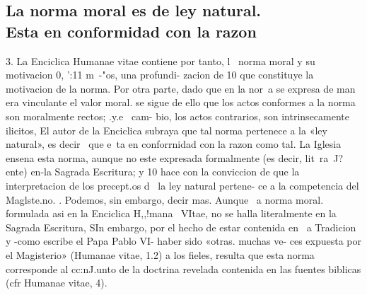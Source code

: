 \documentclass[letterpaper]{report}
\begin{document}
		\subsection{La norma moral es de ley natural.\\ Esta en conformidad con la razon}
			3. La Enciclica Humanae vitae contiene por tanto, l~ 
			norma moral y su motivacion 0, ':11 m~-"os, una profundi- 
			zacion de 10 que constituye la motivacion de la norma. Por 
			otra parte, dado que en la nor~a se expresa de man era 
			vinculante el valor moral. se sigue de ello que los actos 
			conformes a la norma son moralmente rectos; .y.e~ cam- 
			bio, los actos contrarios, son intrinsecamente ilicitos, El 
			autor de la Enciclica subraya que tal norma pertenece a 
			la «ley natural», es decir~ que e~ta en conforrnidad con la 
			razon como tal. La Iglesia ensena esta norma, aunque no 
			este expresada formalmente (es decir, lit~ra~J?ente) en-la 
			Sagrada Escritura; y 10 hace con la conviccion de que la 
			interpretacion de los precept.os d~ la ley natural pertene- 
			ce a la competencia del Maglste.no. . 
			Podemos, sin embargo, decir mas. Aunque ~a norma 
			moral. formulada asi en la Enciclica H,,!mana~ VItae, no se 
			halla literalmente en la Sagrada Escritura, SIn embargo, 
			por el hecho de estar contenida en ~a Tradicion y -como 
			escribe el Papa Pablo VI- haber sido «otras. muchas ve- 
			ces expuesta por el Magisterio» (Humanae vitae, 1.2) a los 
			fieles, resulta que esta norma corresponde al cc:nJ.unto de 
			la doctrina revelada contenida en las fuentes biblicas (cfr 
			Humanae vitae, 4).
		
\end{document}
